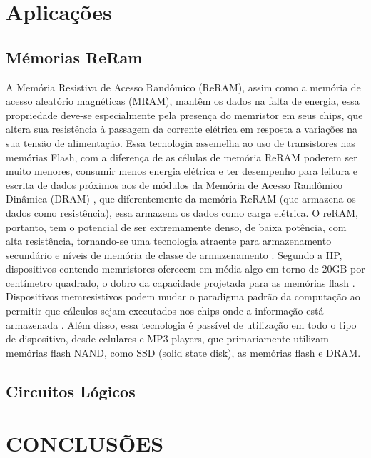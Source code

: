 \documentclass{ceel}
\begin{document}
\begin{multicols}{2}
\section{Aplicações}\label{aplicacoes}
\subsection{Mémorias ReRam}
A Memória Resistiva de Acesso Randômico (ReRAM), assim como a memória de acesso aleatório magnéticas (MRAM), mantêm os dados na falta de energia, essa propriedade deve-se especialmente pela presença do memristor em seus chips, que altera sua resistência à passagem da corrente elétrica em resposta a variações na sua tensão de alimentação.
Essa tecnologia assemelha ao uso de transistores nas memórias Flash, com a diferença de as células de memória ReRAM poderem ser muito menores, consumir menos energia elétrica e ter desempenho para leitura e escrita de dados próximos aos de módulos da Memória de Acesso Randômico Dinâmica (DRAM)\cite{blog} , que diferentemente da memória ReRAM (que armazena os dados como resistência), essa armazena os dados como carga elétrica.
O reRAM, portanto, tem o potencial de ser extremamente denso, de baixa potência, com alta resistência, tornando-se uma tecnologia atraente para armazenamento secundário e níveis de memória de classe de armazenamento \cite{prog}. Segundo a HP, dispositivos contendo memristores oferecem em média algo em torno de 20GB por centímetro quadrado, o dobro da capacidade projetada para as memórias flash \cite{hp}.
Dispositivos memresistivos podem mudar o paradigma padrão da computação ao permitir que cálculos sejam executados nos chips onde a informação está armazenada \cite{hp}. Além disso, essa tecnologia é passível de utilização em todo o tipo de dispositivo, desde celulares e MP3 players, que primariamente utilizam memórias flash NAND, como SSD (solid state disk), as memórias flash e DRAM.

\subsection{Circuitos Lógicos} %


\section{CONCLUSÕES}


\begin{thebibliography}{9}


\end{thebibliography}
\end{multicols}
\end{document}
